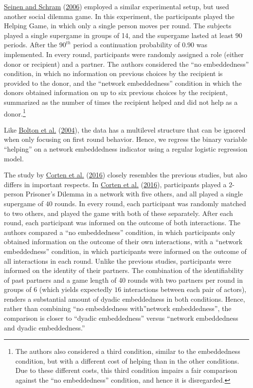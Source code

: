 \documentclass[
  11pt,
]{article}
\begin{document}
\protect\hyperlink{ref-seinen_schram_social_2006}{Seinen and Schram} (\protect\hyperlink{ref-seinen_schram_social_2006}{2006}) employed a similar experimental setup, but used another social dilemma game.
In this experiment, the participants played the Helping Game, in which only a single person moves per round.
The subjects played a single supergame in groups of 14, and the supergame lasted at least \(90\) periods.
After the \(90^{th}\) period a continuation probability of \(0.90\) was implemented.
In every round, participants were randomly assigned a role (either donor or recipient) and a partner.
The authors considered the ``no embeddedness'' condition, in which no information on previous choices by the recipient is provided to the donor, and the ``network embeddedness'' condition in which the donors obtained information on up to six previous choices by the recipient, summarized as the number of times the recipient helped and did not help as a donor.\footnote{
  The authors also considered a third condition, similar to the embeddedness condition, but with a different cost of helping than in the other conditions. Due to these different costs, this third condition impairs a fair comparison against the ``no embeddedness'' condition, and hence it is disregarded.}

Like \protect\hyperlink{ref-bolton_electronic_2004}{Bolton et al.} (\protect\hyperlink{ref-bolton_electronic_2004}{2004}), the data has a multilevel structure that can be ignored when only focusing on first round behavior.
Hence, we regress the binary variable ``helping'' on a network embeddedness indicator using a regular logistic regression model.

The study by \protect\hyperlink{ref-corten_etal_reputation_2016}{Corten et al.} (\protect\hyperlink{ref-corten_etal_reputation_2016}{2016}) closely resembles the previous studies, but also differs in important respects.
In \protect\hyperlink{ref-corten_etal_reputation_2016}{Corten et al.} (\protect\hyperlink{ref-corten_etal_reputation_2016}{2016}), participants played a \(2\)-person Prisoner's Dilemma in a network with five others, and all played a single supergame of \(40\) rounds.
In every round, each participant was randomly matched to two others, and played the game with both of these separately.
After each round, each participant was informed on the outcome of both interactions.
The authors compared a ``no embeddedness'' condition, in which participants only obtained information on the outcome of their own interactions, with a ``network embeddedness'' condition, in which participants were informed on the outcome of all interactions in each round.
Unlike the previous studies, participants were informed on the identity of their partners.
The combination of the identifiability of past partners and a game length of 40 rounds with two partners per round in groups of \(6\) (which yields expectedly \(16\) interactions between each pair of actors), renders a substantial amount of dyadic embeddedness in both conditions.
Hence, rather than combining ``no embeddedness with''network embeddedness'', the comparison is closer to ``dyadic embeddedness'' versus ``network embeddedness and dyadic embeddedness.''
\end{document}
